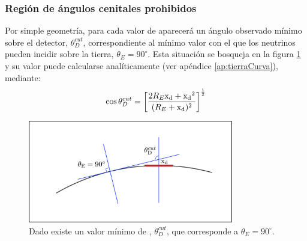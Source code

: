 	\subsubsection{Regi\'on de \'angulos cenitales prohibidos}
	Por simple geometr\'ia, para cada valor de \xd{} aparecer\'a un \'angulo observado m\'inimo sobre el detector, $\theta_D^{cut}$, correspondiente al m\'inimo valor con el que los neutrinos pueden incidir sobre la tierra, $\theta_E=90^\circ$.
	Esta situaci\'on se bosqueja en la figura \ref{fig:curveEarthSketch_thCut0} y su valor puede calcularse anal\'iticamente (ver ap\'endice \ref{ap:tierraCurva}), mediante:
	\begin{equation}
	\cos \theta_D^{cut} = \left[ \frac{2 R_E {\rm x_d}+{\rm x_d}^2}{(R_E+{\rm x_d})^2} \right]^{\frac{1}{2}}
	\label{eq:tdc0}
	\end{equation}
	\begin{figure}[ht!]
		\centering
		\includegraphics[width=0.8\textwidth]{./fig/appendix/curveEarthSketch_thCut.pdf}
		\caption{\label{fig:curveEarthSketch_thCut0}
		Dado \xd{} existe un valor m\'inimo de \td{}, $\theta_D^{cut}$, que corresponde a $\theta_E=90^\circ$.
		}
	\end{figure}
	
